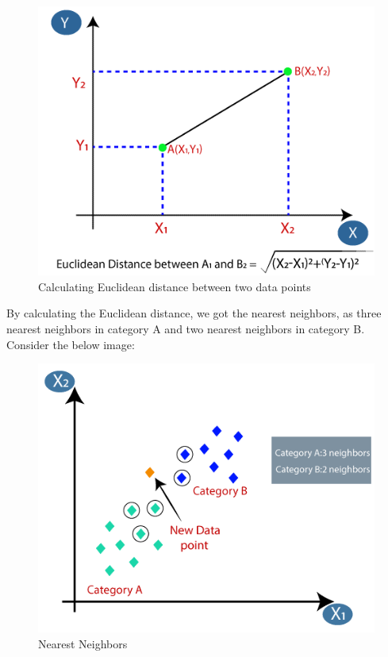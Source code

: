 \begin{figure}[H]
    \includegraphics[width=\linewidth]{images/knnexp3.png}
    \caption{Calculating Euclidean distance between two data points}
    \label{fig:exp3}
\end{figure}

By calculating the Euclidean distance, we got the nearest neighbors, as three nearest neighbors in category A and two nearest neighbors in category B. Consider the below image:
\begin{figure}[H]
    \includegraphics[width=\linewidth]{images/knnexp4.png}
    \caption{Nearest Neighbors}
    \label{fig:knnexp4}
\end{figure}

